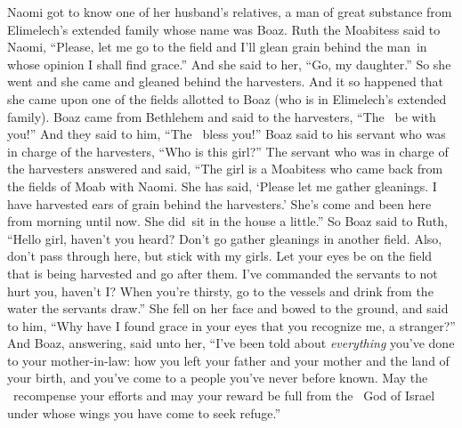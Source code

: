 
\begin{inparaenum}
   Naomi got to know one of her husband's relatives, a man of great substance from Elimelech's extended family whose name was Boaz.%
   Ruth the Moabitess said to Naomi, ``Please, let me go to the field and I'll glean grain behind the man\understood\ in whose opinion I shall find grace.'' And she said to her, ``Go, my daughter.''%
   So she went and she came and gleaned behind the harvesters. And it so happened that she came upon one of the fields allotted to Boaz (who is in Elimelech's extended family).%
   Boaz came from Bethlehem and said to the harvesters, ``The \lord\ be with you!'' And they said to him, ``The \lord\ bless you!''%
   Boaz said to his servant who was in charge of the harvesters, ``Who is this girl?''%
   The servant who was in charge of the harvesters answered and said, ``The girl is a Moabitess who came back from the fields of Moab with Naomi.%
   She has said, `Please let me gather gleanings. I have harvested ears of grain behind the harvesters.' She's come and been here from morning until now. She did\understood\ sit in the house a little.''%
   So Boaz said to Ruth, ``Hello girl, haven't you heard? Don't go gather gleanings in another field. Also, don't pass through here, but stick with my girls.%
   Let your eyes be on the field that is being harvested and go after them. I've commanded the servants to not hurt you, haven't I? When you're thirsty, go to the vessels and drink from the water\understood{} the servants draw.''%
   She fell on her face and bowed to the ground, and said to him, ``Why have I found grace in your eyes that you recognize me, a stranger?''%
   And Boaz, answering, said unto her, ``I've been told about \emph{everything} you've done to your mother-in-law: how you left your father and your mother and the land of your birth, and you've come to a people you've never before known.%
   May the \lord\ recompense your efforts and may your reward be full from the \lord\ God of Israel under whose wings you have come to seek refuge.''%

\end{inparaenum}
